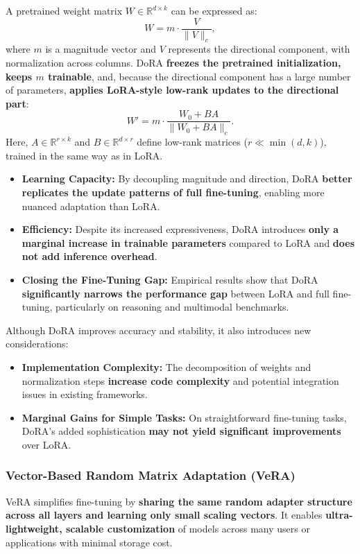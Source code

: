 \documentclass[11pt,a4paper]{article}
\begin{document}
A pretrained weight matrix $W \in \mathbb{R}^{d \times k}$ can be expressed as:
\[
W = m \cdot \frac{V}{\|V\|_c},
\]
where $m$ is a magnitude vector and $V$ represents the directional component, with normalization across columns.  
DoRA \textbf{freezes the pretrained initialization, keeps $m$ trainable}, and, because the directional component has a large number of parameters, \textbf{applies LoRA-style low-rank updates to the directional part}:
\[
W' = m \cdot \frac{W_0 + BA}{\|W_0 + BA\|_c}.
\]
Here, $A \in \mathbb{R}^{r \times k}$ and $B \in \mathbb{R}^{d \times r}$ define low-rank matrices ($r \ll \min(d,k)$), trained in the same way as in LoRA.

\begin{itemize}[leftmargin=1.5em]
    \item \textbf{Learning Capacity:} By decoupling magnitude and direction, DoRA \textbf{better replicates the update patterns of full fine-tuning}, enabling more nuanced adaptation than LoRA.
    \item \textbf{Efficiency:} Despite its increased expressiveness, DoRA introduces \textbf{only a marginal increase in trainable parameters} compared to LoRA and \textbf{does not add inference overhead}.
    \item \textbf{Closing the Fine-Tuning Gap:} Empirical results show that DoRA \textbf{significantly narrows the performance gap} between LoRA and full fine-tuning, particularly on reasoning and multimodal benchmarks.
\end{itemize}

Although DoRA improves accuracy and stability, it also introduces new considerations:
\begin{itemize}[leftmargin=1.5em]
    \item \textbf{Implementation Complexity:} The decomposition of weights and normalization steps \textbf{increase code complexity} and potential integration issues in existing frameworks.
    \item \textbf{Marginal Gains for Simple Tasks:} On straightforward fine-tuning tasks, DoRA's added sophistication \textbf{may not yield significant improvements} over LoRA.
\end{itemize}

\subsubsection{Vector-Based Random Matrix Adaptation (VeRA)}
VeRA simplifies fine-tuning by \textbf{sharing the same random adapter structure across all layers and learning only small scaling vectors}.
It enables \textbf{ultra-lightweight, scalable customization} of models across many users or applications with minimal storage cost.
\end{document}
